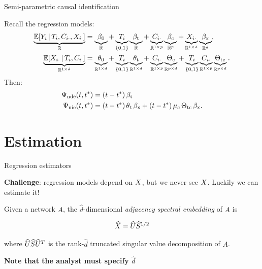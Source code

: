 \documentclass{beamer}
\theoremstyle{remark}
\begin{document}
\begin{frame}{Semi-parametric causal identification}

    Recall the regression models:
    \begin{equation*}
        \begin{aligned}
            \underbrace{\E[T_i, \C_{i \cdot}, \X_{i \cdot}]{Y_i}}_{\R}
             & = \underbrace{\betazero}_{\R}
            + \underbrace{T_i}_{\{0, 1\}} \underbrace{\betat}_{\R}
            + \underbrace{\C_{i \cdot}}_{\R^{1 \times p}} \underbrace{\betac}_{\R^{p}}
            + \underbrace{\X_{i \cdot}}_{\R^{1 \times d}} \underbrace{\betax}_{\R^d}, \\
            \underbrace{\E[T_i, \C_{i \cdot}]{\X_{i \cdot}}}_{\R^{1 \times d}}
             & = \underbrace{\thetazero}_{\R^{1 \times d}}
            + \underbrace{T_i}_{\{0, 1\}} \underbrace{\thetat}_{\R^{1 \times d}}
            + \underbrace{\C_{i \cdot}}_{\R^{1 \times p}} \underbrace{\Thetac}_{\R^{p \times d}}
            + \underbrace{T_i}_{\{0, 1\}} \underbrace{\C_{i \cdot}}_{\R^{1 \times p}} \underbrace{\Thetatc}_{\R^{p \times d}}.
        \end{aligned}
    \end{equation*}
    Then:
    \begin{align*}
        \ndef & = \paren*{t - t^*} \, \betat                                                        \\
        \nief & = \paren*{t - t^*} \, \thetat \, \betax + (t - t^*) \, \mu_c \, \Thetatc \, \betax.
    \end{align*}

\end{frame}

\section{Estimation}

\begin{frame}{Regression estimators}

    \textbf{Challenge}: regression models depend on $X$, but we never see $X$. Luckily we can estimate it!

    \begin{definition}[ASE]

        Given a network $A$, the $\widehat{d}$-dimensional \emph{adjacency spectral embedding} of $A$ is

        \begin{align*}
            \widehat{X} = \widehat{U} \widehat{S}^{1/2}
        \end{align*}

        \noindent where $\widehat{U} \widehat{S} \widehat{U}^T$ is the rank-$\widehat{d}$ truncated singular value decomposition of $A$.

    \end{definition}

    \textbf{Note that the analyst must specify $\widehat{d}$}

\end{frame}
\end{document}
